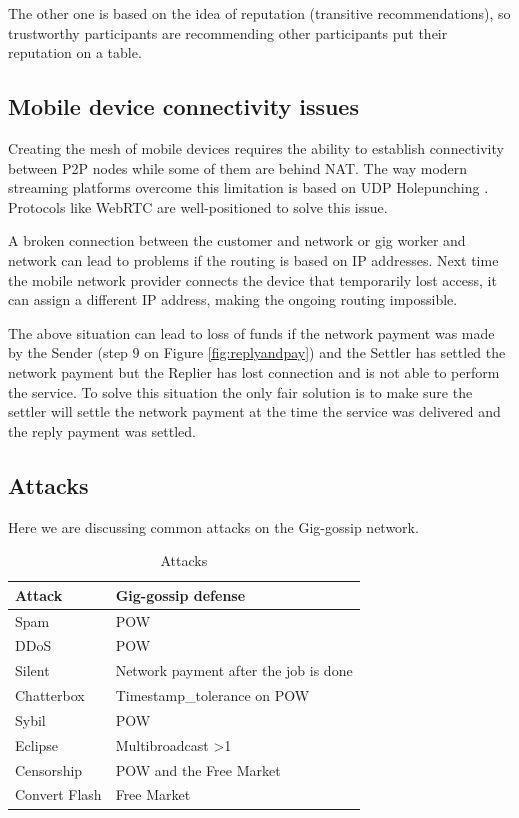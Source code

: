 \documentclass{article}
\begin{document}
The other one is based on the idea of reputation (transitive recommendations), so trustworthy participants are recommending other participants put their reputation on a table.

\subsection{Mobile device connectivity issues}
\label{mobdev}

Creating the mesh of mobile devices requires the ability to establish connectivity between P2P nodes while some of them are behind NAT. The way modern streaming platforms overcome this limitation is based on UDP Holepunching \cite{HolePunching}. Protocols like WebRTC \cite{WebRTC} are well-positioned to solve this issue.

A broken connection between the customer and network or gig worker and network can lead to problems if the routing is based on IP addresses. Next time the mobile network provider connects the device that temporarily lost access, it can assign a different IP address, making the ongoing routing impossible.

The above situation can lead to loss of funds if the network payment was made by the Sender (step 9 on Figure \ref{fig:replyandpay}) and the Settler has settled the network payment but the Replier has lost connection and is not able to perform the service. To solve this situation the only fair solution is to make sure the settler will settle the network payment at the time the service was delivered and the reply payment was settled.

\subsection{Attacks}
Here we are discussing common attacks on the Gig-gossip network.


\begin{table}  
	\centering
	\begin{tabular}{ll}
		\toprule
		Attack         & Gig-gossip defense \\
		\midrule
		Spam           & POW \\
		DDoS           & POW \\
		Silent         & Network payment after the job is done \\
		Chatterbox     & Timestamp\_tolerance on POW\\
		Sybil          & POW \\
		Eclipse        & Multibroadcast >1 \\
		Censorship     & POW and the Free Market \\
		Convert Flash  & Free Market \\
		\bottomrule
	\end{tabular}
	\label{tab:attacks}
	\caption{Attacks}
\end{table}
\end{document}
